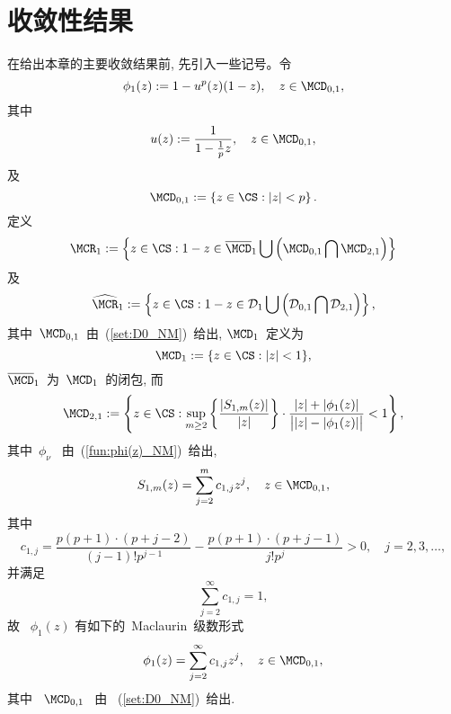 \section{收敛性结果}


在给出本章的主要收敛结果前, 先引入一些记号。令
\begin{equation}
\label{fun:phi(z)_NM} \phi_1(z) := 1 - u^p(z)(1 - z), \quad z \in
\MCD_{0,1},
\end{equation}
其中
\begin{equation*} u(z) := \frac{1}{1 - \frac{1}{p}z}, \quad z
\in \MCD_{0,1},
\end{equation*}
及
\begin{equation}
\label{set:D0_NM} \MCD_{0,1} := \left\{z \in \CS: |z| < p \right\}.
\end{equation}
定义
\begin{equation}
\label{set:R_NM} \MCR_1 := \left\{z\in \CS: 1 - z \in
\overline{\MCD}_1 \bigcup \left(\MCD_{0,1} \bigcap
\MCD_{2,1}\right)\right\}
\end{equation}
及
\begin{equation}
\label{set:R_hat_NM} \widehat{\MCR}_1 := \left\{z\in\CS: 1-z \in
\mathcal {D}_1 \bigcup \left(\mathcal {D}_{0,1} \bigcap \mathcal
{D}_{2,1}\right)\right\},
\end{equation}
其中~$\MCD_{0,1}$~由~(\ref{set:D0_NM})~给出, $\MCD_1$~定义为
\begin{equation}
\label{set:D1_NM} \MCD_1 := \{z \in \CS: |z| < 1\},
\end{equation}
$\overline{\MCD}_1$~为~$\MCD_1$~的闭包, 而
\begin{equation}
\label{set:D2_NM} \MCD_{2,1} := \left\{z \in \CS: \sup_{m \geq 2}
\left\{\frac{|S_{1,m}(z)|}{|z|}\right\} \cdot \frac{|z|
+|\phi_1(z)|}{\big||z| - |\phi_1(z)|\big|} < 1 \right\},
\end{equation}
其中~$\phi_\nu$~ 由~(\ref{fun:phi(z)_NM})~给出,
\begin{equation}
\label{ser:Sm(z)_NM} S_{1,m}(z) = \sum\limits_{j = 2}^{m} c_{1,j}
z^{j}, \quad z \in \MCD_{0,1},
\end{equation}
其中
\begin{equation*}
\label{cons:NM_c1j} c_{1,j} =
\frac{p(p+1)\cdot(p+j-2)}{(j-1)!p^{j-1}} -
\frac{p(p+1)\cdot(p+j-1)}{j!p^j} > 0, \quad j=2,3,\ldots,
\end{equation*}
并满足
$$
\sum_{j=2}^\infty c_{1,j}=1,
$$
故 ~$\phi_1(z)$ 有如下的~Maclaurin~级数形式
\begin{equation}
\label{fun:phi1(z)_series} \phi_1(z) = \sum_{j=2}^\infty c_{1,j}
z^j, \quad z \in \MCD_{0,1},
\end{equation}
其中 ~$\MCD_{0,1}$~ 由 ~(\ref{set:D0_NM})~给出.



